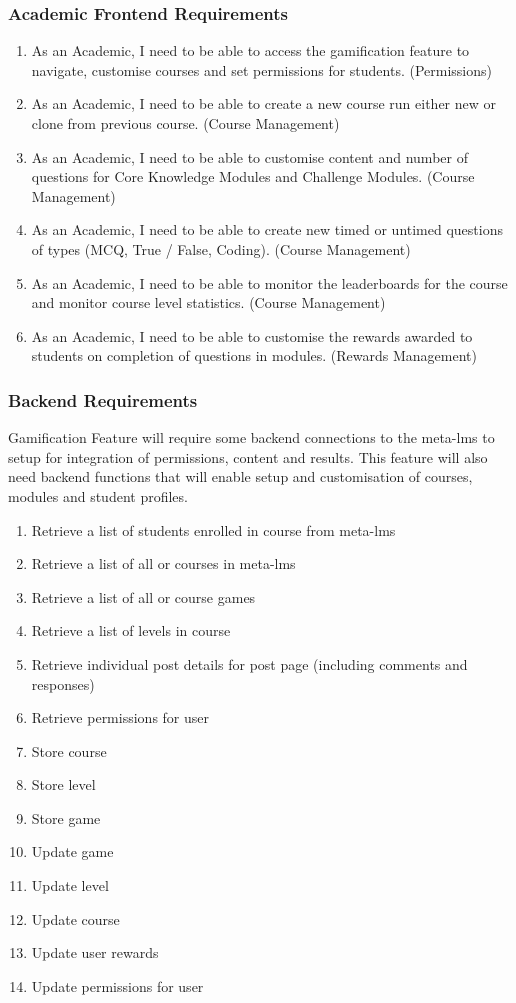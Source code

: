 \subsubsection{Academic Frontend Requirements}
\begin{enumerate}
    \item As an Academic, I need to be able to access the gamification feature to navigate, customise courses and set permissions for students. (Permissions)
    \item As an Academic, I need to be able to create a new course run either new or clone from previous course. (Course Management)
    \item As an Academic, I need to be able to customise content and number of questions for Core Knowledge Modules and Challenge Modules. (Course Management)
    \item As an Academic, I need to be able to create new timed or untimed questions of types (MCQ, True / False, Coding). (Course Management)
    \item As an Academic, I need to be able to monitor the leaderboards for the course and monitor course level statistics. (Course Management)
    \item As an Academic, I need to be able to customise the rewards awarded to students on completion of questions in modules. (Rewards Management)
\end{enumerate}

\newpage

\subsubsection{Backend Requirements}
Gamification Feature will require some backend connections to the meta-lms to setup for integration of permissions, content and results.
This feature will also need backend functions that will enable setup and customisation of courses, modules and student profiles.

\begin{enumerate}
    \item Retrieve a list of students enrolled in course from meta-lms
    \item Retrieve a list of all or courses in meta-lms
    \item Retrieve a list of all or course games
    \item Retrieve a list of levels in course
    \item Retrieve individual post details for post page (including comments and responses)
    \item Retrieve permissions for user
    \item Store course
    \item Store level
    \item Store game
    \item Update game
    \item Update level
    \item Update course
    \item Update user rewards
    \item Update permissions for user
\end{enumerate}

